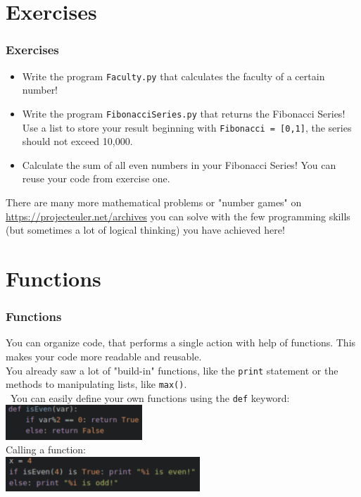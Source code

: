 \documentclass{beamer}
\begin{document}
\section{Exercises}

\begin{frame}
\frametitle{Exercises}
	\begin{itemize}
		\item Write the program \texttt{Faculty.py} that calculates the faculty of a certain number!
		\item Write the program \texttt{FibonacciSeries.py} that returns the Fibonacci Series! Use a list to store your result beginning with \texttt{Fibonacci = [0,1]}, the series should not exceed 10,000.
		\item Calculate the sum of all even numbers in your Fibonacci Series! You can reuse your code from exercise one.
	\end{itemize}
	There are many more mathematical problems or "number games" on \url {https://projecteuler.net/archives} you can solve with the few programming skills (but sometimes a lot of logical thinking) you have achieved here!
\end{frame}

\section{Functions}

\begin{frame}
\frametitle{Functions}
	You can organize code, that performs a single action with help of functions. This makes your code more readable and reusable. \\ You already saw a lot of "build-in" functions, like the \texttt{print} statement or the methods to manipulating lists, like \texttt{max()}. \\\ You can easily define your own functions using the \texttt{def} keyword:\\
		\includegraphics[height = 1.3cm]{isEvenFunc.pdf}\\
	Calling a function: \\
		\includegraphics[height = 1.3cm]{FunctionUse.pdf}	 
\end{frame}
\end{document}
